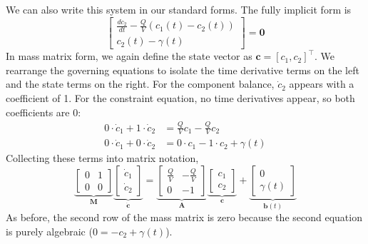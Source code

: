 We can also write this system in our standard forms. The fully implicit form is
\begin{equation}
    \begin{bmatrix}
    \frac{dc_2}{dt} - \frac{Q}{V}(c_1(t) - c_2(t)) \\
    c_2(t) - \gamma(t)
    \end{bmatrix} = \mathbf{0}
\end{equation}
In mass matrix form, we again define the state vector as $\mathbf{c} = [c_1, c_2]^\top$. We rearrange the governing equations to isolate the time derivative terms on the left and the state terms on the right. For the component balance, $\dot{c}_2$ appears with a coefficient of 1. For the constraint equation, no time derivatives appear, so both coefficients are 0:
\begin{equation}
    \begin{aligned}
        0 \cdot \dot{c}_1 + 1 \cdot \dot{c}_2 &= \frac{Q}{V} c_1 - \frac{Q}{V} c_2 \\
        0 \cdot \dot{c}_1 + 0 \cdot \dot{c}_2 &= 0 \cdot c_1 - 1 \cdot c_2 + \gamma(t)
    \end{aligned}
\end{equation}
Collecting these terms into matrix notation,
\begin{equation}
    \underbrace{\begin{bmatrix} 0 & 1 \\ 0 & 0 \end{bmatrix}}_{\mathbf{M}} 
    \underbrace{\begin{bmatrix} \dot{c}_1 \\ \dot{c}_2 \end{bmatrix}}_{\dot{\mathbf{c}}} 
    = 
    \underbrace{\begin{bmatrix} \frac{Q}{V} & -\frac{Q}{V} \\ 0 & -1 \end{bmatrix}}_{\mathbf{A}} 
    \underbrace{\begin{bmatrix} c_1 \\ c_2 \end{bmatrix}}_{\mathbf{c}} 
    + 
    \underbrace{\begin{bmatrix} 0 \\ \gamma(t) \end{bmatrix}}_{\mathbf{b}(t)}
\end{equation}
As before, the second row of the mass matrix is zero because the second equation is purely algebraic ($0 = -c_2 + \gamma(t)$).

